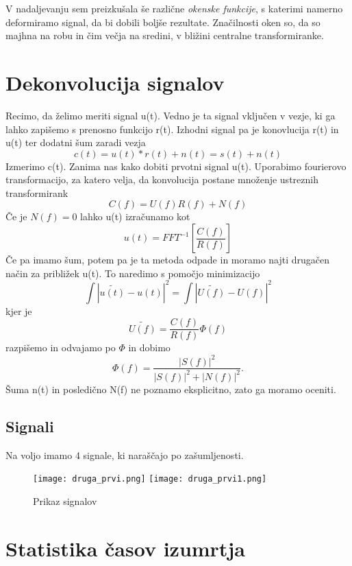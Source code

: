 \documentclass[11pt, a4paper]{article}
\begin{document}
V nadaljevanju sem preizkušala še različne \textit{okenske funkcije}, s katerimi namerno deformiramo signal, da bi dobili boljše rezultate. Značilnosti oken so, da so majhna na robu in čim večja na sredini, v bližini centralne transformiranke.


\section{Dekonvolucija signalov}
Recimo, da želimo meriti signal u(t). Vedno je ta signal vključen v vezje, ki ga lahko zapišemo s prenosno funkcijo r(t). Izhodni signal pa je konovlucija r(t) in u(t) ter dodatni šum zaradi vezja
\begin{equation}
c(t) = u(t) * r(t) + n(t) = s(t) + n(t)
\end{equation}
Izmerimo c(t). Zanima nas kako dobiti prvotni signal u(t). Uporabimo fourierovo transformacijo, za katero velja, da konvolucija postane množenje ustreznih transformirank
\begin{equation}
C(f) = U(f) R(f) + N(f)
\end{equation}
Če je $N(f) = 0$ lahko u(t) izračunamo kot
\begin{equation}
u(t) = FFT^{-1} [\frac{C(f)}{R(f)}]
\end{equation}
Če pa imamo šum, potem pa je ta metoda odpade in moramo najti drugačen način za približek u(t). To naredimo s pomočjo minimizacijo
\begin{equation}
\int |\widetilde{u(t)} - u(t)|^2 = \int |\widetilde{U(f)} - U(f)|^2 
\end{equation}
kjer je 
\begin{equation}
\widetilde{U(f)} = \frac{C(f)}{R(f)} \Phi(f)
\end{equation}
razpišemo in odvajamo po $\Phi$ in dobimo
\begin{equation}
\Phi(f) = \frac{|S(f)|^2}{|S(f)|^2 + |N(f)|^2}.
\end{equation}
Šuma n(t) in posledično N(f) ne poznamo eksplicitno, zato ga moramo oceniti.
\subsection{Signali}
Na voljo imamo 4 signale, ki naraščajo po zašumljenosti.
\begin{figure}[H]
\texttt{[image: druga\_prvi.png]}
\texttt{[image: druga\_prvi1.png]}

\caption{Prikaz signalov}  
\end{figure}
\iffalse
\section{Statistika časov izumrtja}
\end{document}
